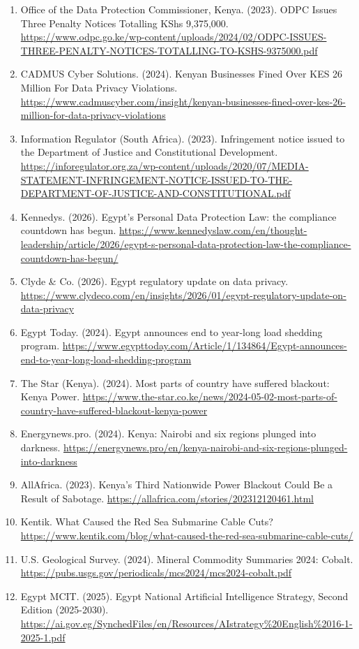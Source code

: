 {\begin{enumerate}
\item Office of the Data Protection Commissioner, Kenya. (2023). ODPC Issues Three Penalty Notices Totalling KShs 9,375,000. \url{https://www.odpc.go.ke/wp-content/uploads/2024/02/ODPC-ISSUES-THREE-PENALTY-NOTICES-TOTALLING-TO-KSHS-9375000.pdf}
\item CADMUS Cyber Solutions. (2024). Kenyan Businesses Fined Over KES 26 Million For Data Privacy Violations. \url{https://www.cadmuscyber.com/insight/kenyan-businesses-fined-over-kes-26-million-for-data-privacy-violations}
\item Information Regulator (South Africa). (2023). Infringement notice issued to the Department of Justice and Constitutional Development. \url{https://inforegulator.org.za/wp-content/uploads/2020/07/MEDIA-STATEMENT-INFRINGEMENT-NOTICE-ISSUED-TO-THE-DEPARTMENT-OF-JUSTICE-AND-CONSTITUTIONAL.pdf}
\item Kennedys. (2026). Egypt's Personal Data Protection Law: the compliance countdown has begun. \url{https://www.kennedyslaw.com/en/thought-leadership/article/2026/egypt-s-personal-data-protection-law-the-compliance-countdown-has-begun/}
\item Clyde \& Co. (2026). Egypt regulatory update on data privacy. \url{https://www.clydeco.com/en/insights/2026/01/egypt-regulatory-update-on-data-privacy}
\item Egypt Today. (2024). Egypt announces end to year-long load shedding program. \url{https://www.egypttoday.com/Article/1/134864/Egypt-announces-end-to-year-long-load-shedding-program}
\item The Star (Kenya). (2024). Most parts of country have suffered blackout: Kenya Power. \url{https://www.the-star.co.ke/news/2024-05-02-most-parts-of-country-have-suffered-blackout-kenya-power}
\item Energynews.pro. (2024). Kenya: Nairobi and six regions plunged into darkness. \url{https://energynews.pro/en/kenya-nairobi-and-six-regions-plunged-into-darkness}
\item AllAfrica. (2023). Kenya's Third Nationwide Power Blackout Could Be a Result of Sabotage. \url{https://allafrica.com/stories/202312120461.html}
\item Kentik. What Caused the Red Sea Submarine Cable Cuts? \url{https://www.kentik.com/blog/what-caused-the-red-sea-submarine-cable-cuts/}
\item U.S. Geological Survey. (2024). Mineral Commodity Summaries 2024: Cobalt. \url{https://pubs.usgs.gov/periodicals/mcs2024/mcs2024-cobalt.pdf}
\item Egypt MCIT. (2025). Egypt National Artificial Intelligence Strategy, Second Edition (2025-2030). \url{https://ai.gov.eg/SynchedFiles/en/Resources/AIstrategy\%20English\%2016-1-2025-1.pdf}

\end{enumerate}}
